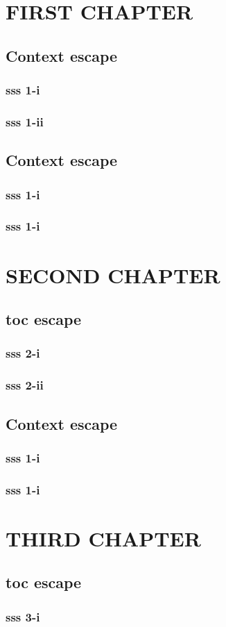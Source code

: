 \documentclass[oneside]{book}
\makeatletter
\renewcommand\tableofcontents {
\if@twocolumn\@restonecoltrue\onecolumn\else\@restonecolfalse\fi
\section*{\contentsname\@mkboth{\MakeUppercase\contentsname}{\MakeUppercase\contentsname}}
\begin{multicols}{2}
  \@starttoc{toc}
\end{multicols}
\if@restonecol\twocolumn\fi
}
\newenvironment{escapemulticol}{}
  {\aftergroup\restore@multicols}
\def\restore@multicols{\begin{multicols}{\saved@colnumber}}
\makeatother
\begin{document}
\thispagestyle{empty}
\tableofcontents

\chapter{FIRST CHAPTER}
\section{Context escape}
\subsection{sss 1-i}
\begin{multicols}{2}
\lipsum[1]

\begin{escapemulticol}
\lipsum[1]
\end{escapemulticol}

\lipsum[1]
\end{multicols}
\subsection{sss 1-ii}
\section{Context escape}
\subsection{sss 1-i}
\subsection{sss 1-i}


\chapter{SECOND CHAPTER}
\section{toc escape}
\subsection{sss 2-i}
\subsection{sss 2-ii}

\section{Context escape}
\subsection{sss 1-i}
\subsection{sss 1-i}


\chapter{THIRD CHAPTER}
\section{toc escape}
\subsection{sss 3-i}
\end{document}
